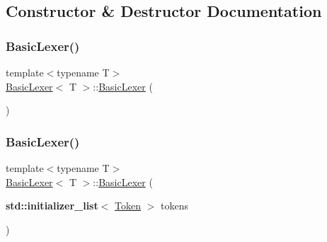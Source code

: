 \subsection{Constructor \& Destructor Documentation}
\mbox{\label{class_basic_lexer_abc267aed0ef7227486b932f13b2917f0}} 
\subsubsection{\texorpdfstring{Basic\+Lexer()}{BasicLexer()}\hspace{0.1cm}{\footnotesize\ttfamily [1/5]}}
{\footnotesize\ttfamily template$<$typename T$>$ \\
\hyperlink{class_basic_lexer}{Basic\+Lexer}$<$ T $>$\+::\hyperlink{class_basic_lexer}{Basic\+Lexer} (\begin{DoxyParamCaption}{ }\end{DoxyParamCaption})\hspace{0.3cm}{\ttfamily [inline]}}

\mbox{\label{class_basic_lexer_a58d2038fb47025d4e32c20750e713b43}} 
\subsubsection{\texorpdfstring{Basic\+Lexer()}{BasicLexer()}\hspace{0.1cm}{\footnotesize\ttfamily [2/5]}}
{\footnotesize\ttfamily template$<$typename T$>$ \\
\hyperlink{class_basic_lexer}{Basic\+Lexer}$<$ T $>$\+::\hyperlink{class_basic_lexer}{Basic\+Lexer} (\begin{DoxyParamCaption}\item[{\textbf{ std\+::initializer\+\_\+list}$<$ \hyperlink{class_token}{Token} $>$}]{tokens }\end{DoxyParamCaption})\hspace{0.3cm}{\ttfamily [inline]}}

\mbox{\label{class_basic_lexer_a7b8cb3ec8ba1ef5567bd280800f891f8}} 
